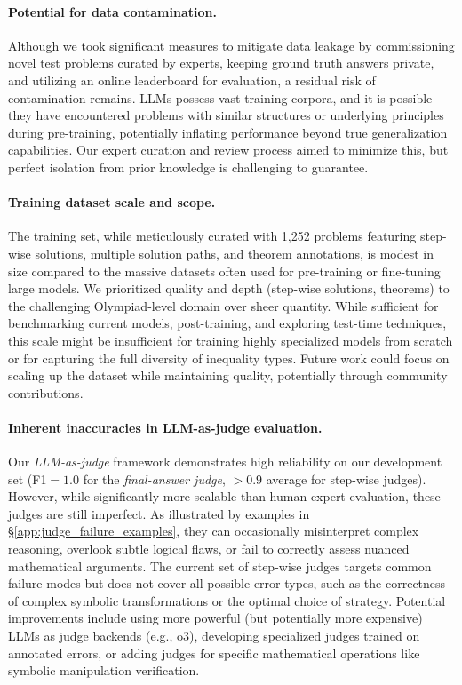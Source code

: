 \paragraph{Potential for data contamination.} Although we took significant measures to mitigate data leakage by commissioning novel test problems curated by experts, keeping ground truth answers private, and utilizing an online leaderboard for evaluation, a residual risk of contamination remains. LLMs possess vast training corpora, and it is possible they have encountered problems with similar structures or underlying principles during pre-training, potentially inflating performance beyond true generalization capabilities. Our expert curation and review process aimed to minimize this, but perfect isolation from prior knowledge is challenging to guarantee.

\paragraph{Training dataset scale and scope.} The \dataset training set, while meticulously curated with 1,252 problems featuring step-wise solutions, multiple solution paths, and theorem annotations, is modest in size compared to the massive datasets often used for pre-training or fine-tuning large models. We prioritized quality and depth (step-wise solutions, theorems) to the challenging Olympiad-level domain over sheer quantity. While sufficient for benchmarking current models, post-training, and exploring test-time techniques, this scale might be insufficient for training highly specialized models from scratch or for capturing the full diversity of inequality types. Future work could focus on scaling up the dataset while maintaining quality, potentially through community contributions.

\paragraph{Inherent inaccuracies in LLM-as-judge evaluation.} Our \textit{LLM-as-judge} framework demonstrates high reliability on our development set (F1$=1.0$ for the \textit{final-answer judge}, $>0.9$ average for step-wise judges). However, while significantly more scalable than human expert evaluation, these judges are still imperfect. As illustrated by examples in \S\ref{app:judge_failure_examples}, they can occasionally misinterpret complex reasoning, overlook subtle logical flaws, or fail to correctly assess nuanced mathematical arguments. The current set of step-wise judges targets common failure modes but does not cover all possible error types, such as the correctness of complex symbolic transformations or the optimal choice of strategy. Potential improvements include using more powerful (but potentially more expensive) LLMs as judge backends (e.g., o3), developing specialized judges trained on annotated errors, or adding judges for specific mathematical operations like symbolic manipulation verification.

